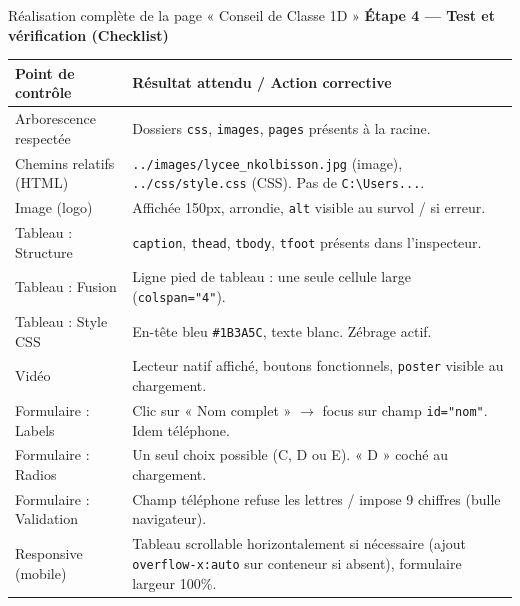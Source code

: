 \documentclass[11pt]{article}
\begin{document}
\begin{exoresolu}{Réalisation complète de la page « Conseil de Classe 1D »}
\textbf{Étape 4 — Test et vérification (Checklist)}
\begin{center}
\begin{tabularx}{\linewidth}{|l|X|}\hline
\textbf{Point de contrôle} & \textbf{Résultat attendu / Action corrective} \\\hline
Arborescence respectée & Dossiers \texttt{css}, \texttt{images}, \texttt{pages} présents à la racine. \\\hline
Chemins relatifs (HTML) & \texttt{../images/lycee\_nkolbisson.jpg} (image), \texttt{../css/style.css} (CSS). Pas de \texttt{C:\textbackslash Users...}. \\\hline
Image (logo) & Affichée 150px, arrondie, \texttt{alt} visible au survol / si erreur. \\\hline
Tableau : Structure & \texttt{caption}, \texttt{thead}, \texttt{tbody}, \texttt{tfoot} présents dans l'inspecteur. \\\hline
Tableau : Fusion & Ligne pied de tableau : une seule cellule large (\texttt{colspan="4"}). \\\hline
Tableau : Style CSS & En-tête bleu \texttt{\#1B3A5C}, texte blanc. Zébrage actif. \\\hline
Vidéo & Lecteur natif affiché, boutons fonctionnels, \texttt{poster} visible au chargement. \\\hline
Formulaire : Labels & Clic sur « Nom complet » $\rightarrow$ focus sur champ \texttt{id="nom"}. Idem téléphone. \\\hline
Formulaire : Radios & Un seul choix possible (C, D ou E). « D » coché au chargement. \\\hline
Formulaire : Validation & Champ téléphone refuse les lettres / impose 9 chiffres (bulle navigateur). \\\hline
Responsive (mobile) & Tableau scrollable horizontalement si nécessaire (ajout \texttt{overflow-x:auto} sur conteneur si absent), formulaire largeur 100\%. \\\hline
\end{tabularx}
\end{center}


\end{exoresolu}
\end{document}
